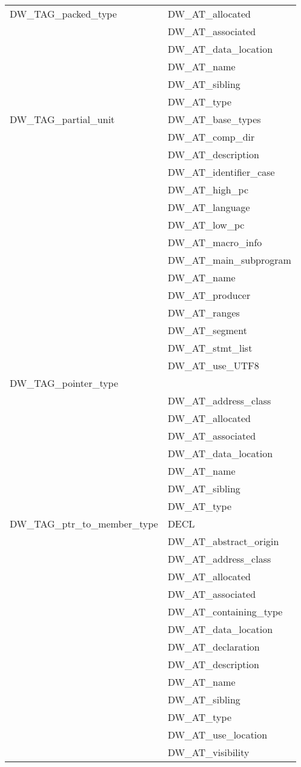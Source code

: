 \begin{longtable}{l|p{8cm}}
DW\_TAG\_packed\_type
&DW\_AT\_allocated \\
&DW\_AT\_associated \\
&DW\_AT\_data\_location \\
&DW\_AT\_name \\
&DW\_AT\_sibling \\
&DW\_AT\_type \\

DW\_TAG\_partial\_unit
&DW\_AT\_base\_types  \\  
&DW\_AT\_comp\_dir  \\
&DW\_AT\_description  \\
&DW\_AT\_identifier\_case  \\
&DW\_AT\_high\_pc  \\
&DW\_AT\_language  \\
&DW\_AT\_low\_pc  \\
&DW\_AT\_macro\_info  \\
&DW\_AT\_main\_subprogram  \\
&DW\_AT\_name  \\
&DW\_AT\_producer  \\
&DW\_AT\_ranges  \\
&DW\_AT\_segment  \\
&DW\_AT\_stmt\_list  \\
&DW\_AT\_use\_UTF8  \\


DW\_TAG\_pointer\_type  \\
&DW\_AT\_address\_class  \\
&DW\_AT\_allocated  \\
&DW\_AT\_associated  \\
&DW\_AT\_data\_location  \\
&DW\_AT\_name  \\
&DW\_AT\_sibling  \\
&DW\_AT\_type  \\

DW\_TAG\_ptr\_to\_member\_type
&DECL  \\
&DW\_AT\_abstract\_origin  \\
&DW\_AT\_address\_class  \\
&DW\_AT\_allocated  \\
&DW\_AT\_associated  \\
&DW\_AT\_containing\_type  \\
&DW\_AT\_data\_location  \\
&DW\_AT\_declaration  \\
&DW\_AT\_description  \\
&DW\_AT\_name  \\
&DW\_AT\_sibling  \\
&DW\_AT\_type  \\
&DW\_AT\_use\_location  \\
&DW\_AT\_visibility  \\



\end{longtable}

